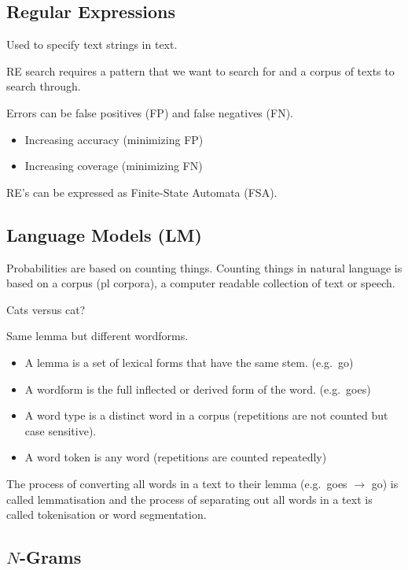 \subsection*{Regular Expressions}

Used to specify text strings in text.

RE search requires a pattern that we want to search for and a corpus of texts to search through.

Errors can be false positives (FP) and false negatives (FN).

\begin{itemize}
  \item Increasing accuracy (minimizing FP)
  \item Increasing coverage (minimizing FN)
\end{itemize}

RE's can be expressed as Finite-State Automata (FSA).


\subsection*{Language Models (LM)}

Probabilities are based on counting things. Counting things in natural language is based on a corpus (pl corpora), a computer readable collection of text or speech.

Cats versus cat?

Same lemma but different wordforms.

\begin{itemize}
  \item A lemma is a set of lexical forms that have the same stem. (e.g.\ go)
  \item A wordform is the full inflected or derived form of the word. (e.g.\ goes)
  \item A word type is a distinct word in a corpus (repetitions are not counted but case sensitive).
  \item A word token is any word (repetitions are counted repeatedly)
\end{itemize}

The process of converting all words in a text to their lemma (e.g.\ goes $\to$ go) is called lemmatisation and the process of separating out all words in a text is called tokenisation or word segmentation.


\subsection*{$N$-Grams}

